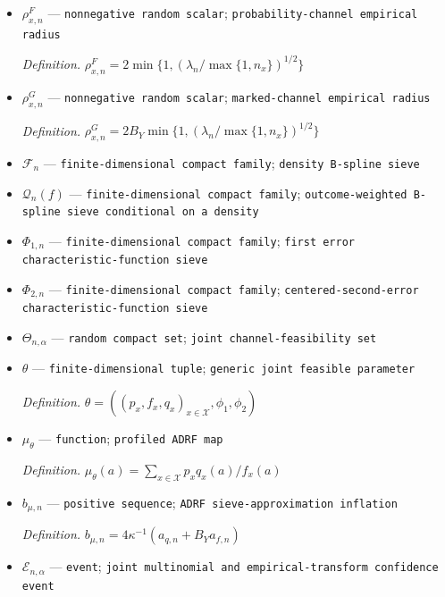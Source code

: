 \documentclass{article}
\begin{document}
\begin{itemize}
  \par\smallskip\noindent\emph{Definition.} \(\delta^G_n=2B_Aa_{q,n}+3B_Y\tau_{e,n}\)
  \item \(\rho^F_{x,n}\) --- \texttt{nonnegative random scalar}; \texttt{probability-\allowbreak{}channel empirical radius}
  \par\smallskip\noindent\emph{Definition.} \(\rho^F_{x,n}=2\min\{1,(\lambda_n/\max\{1,n_x\})^{1/2}\}\)
  \item \(\rho^G_{x,n}\) --- \texttt{nonnegative random scalar}; \texttt{marked-\allowbreak{}channel empirical radius}
  \par\smallskip\noindent\emph{Definition.} \(\rho^G_{x,n}=2B_Y\min\{1,(\lambda_n/\max\{1,n_x\})^{1/2}\}\)
  \item \(\mathscr F_n\) --- \texttt{finite-\allowbreak{}dimensional compact family}; \texttt{density B-\allowbreak{}spline sieve}
  \item \(\mathscr Q_n(f)\) --- \texttt{finite-\allowbreak{}dimensional compact family}; \texttt{outcome-\allowbreak{}weighted B-\allowbreak{}spline sieve conditional on a density}
  \item \(\Phi_{1,n}\) --- \texttt{finite-\allowbreak{}dimensional compact family}; \texttt{first error characteristic-\allowbreak{}function sieve}
  \item \(\Phi_{2,n}\) --- \texttt{finite-\allowbreak{}dimensional compact family}; \texttt{centered-\allowbreak{}second-\allowbreak{}error characteristic-\allowbreak{}function sieve}
  \item \(\Theta_{n,\alpha}\) --- \texttt{random compact set}; \texttt{joint channel-\allowbreak{}feasibility set}
  \item \(\theta\) --- \texttt{finite-\allowbreak{}dimensional tuple}; \texttt{generic joint feasible parameter}
  \par\smallskip\noindent\emph{Definition.} \(\theta=((p_x,f_x,q_x)_{x\in\mathcal X},\phi_1,\phi_2)\)
  \item \(\mu_{\theta}\) --- \texttt{function}; \texttt{profiled ADRF map}
  \par\smallskip\noindent\emph{Definition.} \(\mu_{\theta}(a)=\sum_{x\in\mathcal X}p_xq_x(a)/f_x(a)\)
  \item \(b_{\mu,n}\) --- \texttt{positive sequence}; \texttt{ADRF sieve-\allowbreak{}approximation inflation}
  \par\smallskip\noindent\emph{Definition.} \(b_{\mu,n}=4\kappa^{-1}(a_{q,n}+B_Ya_{f,n})\)
  \item \(\mathcal E_{n,\alpha}\) --- \texttt{event}; \texttt{joint multinomial and empirical-\allowbreak{}transform confidence event}

\end{itemize}
\end{document}
